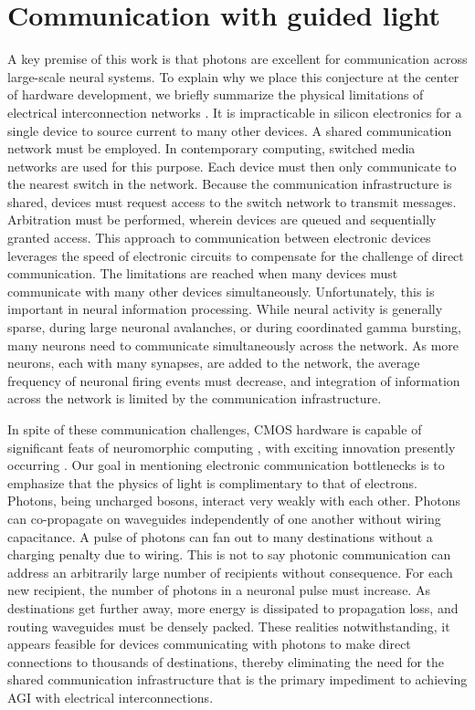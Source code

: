 \documentclass[twocolumn]{article}
\begin{document}
\section{\label{sec:communication}Communication with guided light}
A key premise of this work is that photons are excellent for communication across large-scale neural systems. To explain why we place this conjecture at the center of hardware development, we briefly summarize the physical limitations of electrical interconnection networks \cite{hepa2012}. It is impracticable in silicon electronics for a single device to source current to many other devices. A shared communication network must be employed. In contemporary computing, switched media networks are used for this purpose. Each device must then only communicate to the nearest switch in the network. Because the communication infrastructure is shared, devices must request access to the switch network to transmit messages. Arbitration must be performed, wherein devices are queued and sequentially granted access. This approach to communication between electronic devices leverages the speed of electronic circuits to compensate for the challenge of direct communication. The limitations are reached when many devices must communicate with many other devices simultaneously. Unfortunately, this is important in neural information processing. While neural activity is generally sparse, during large neuronal avalanches, or during coordinated gamma bursting, many neurons need to communicate simultaneously across the network. As more neurons, each with many synapses, are added to the network, the average frequency of neuronal firing events must decrease, and integration of information across the network is limited by the communication infrastructure.

In spite of these communication challenges, CMOS hardware is capable of significant feats of neuromorphic computing \cite{bo2000,pfgr2013,mear2014,fuga2014,payu2017}, with exciting innovation presently occurring \cite{kuwa2017}. Our goal in mentioning electronic communication bottlenecks is to emphasize that the physics of light is complimentary to that of electrons. Photons, being uncharged bosons, interact very weakly with each other. Photons can co-propagate on waveguides independently of one another without wiring capacitance. A pulse of photons can fan out to many destinations without a charging penalty due to wiring. This is not to say photonic communication can address an arbitrarily large number of recipients without consequence. For each new recipient, the number of photons in a neuronal pulse must increase. As destinations get further away, more energy is dissipated to propagation loss, and routing waveguides must be densely packed. These realities notwithstanding, it appears feasible for devices communicating with photons to make direct connections to thousands of destinations, thereby eliminating the need for the shared communication infrastructure that is the primary impediment to achieving AGI with electrical interconnections.
\end{document}
